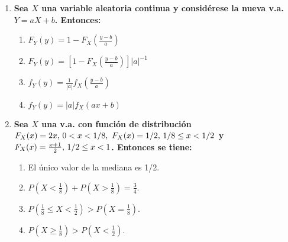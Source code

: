 \documentclass[fleqn]{article}
\def\s{\thinspace}
\def\ss{\thinspace \thinspace}
\begin{document}
\begin{enumerate}
\begin{enumerate}
                                \item \textbf{Sea $X$ una variable aleatoria continua y considérese la nueva v.a. $Y = aX + b$. Entonces:}
                                        \begin{enumerate}
                                                \item $F_Y (y) = 1 - F_X \left(\frac{y-b}{a}\right)$
                                                \item $F_Y (y) = \left[1 - F_X \left(\frac{y-b}{a}\right)\right] |a|^{-1}$
                                                \item $f_Y (y) = \frac{1}{|a|} f_X \left(\frac{y-b}{a}\right) $
                                                \item $f_Y (y) = |a| f_X (ax+b)$
                                        \end{enumerate}
                                
                                \item \textbf{Sea $X$ una v.a. con función de distribución $F_X(x) = 2x, \s 0<x<1/8, \ss F_X(x) = 1/2, \s 
                                        1/8 \leq x < 1/2 $ y $F_X (x) = \frac{x+1}{2}, \s 1/2 \leq x < 1$. Entonces se tiene: }
                                        \begin{enumerate}
                                                \item El único valor de la mediana es 1/2.
                                                \item $P\left(X < \frac{1}{8}\right) + P\left(X > \frac{1}{8}\right) = \frac{3}{4}$.
                                                \item $P\left(\frac{1}{8} \leq X < \frac{1}{2}\right) > P\left(X = \frac{1}{8}\right)$.
                                                \item $P\left(X \geq \frac{1}{8}\right) > P\left(X < \frac{1}{2}\right)$.
                                        \end{enumerate}


\end{enumerate}
\end{enumerate}
\end{document}

